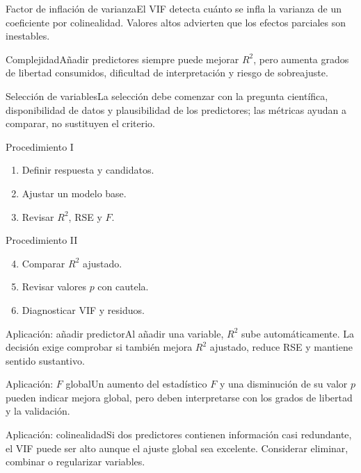 \documentclass[10pt,aspectratio=169]{beamer}
\begin{document}
\begin{frame}{Factor de inflación de varianza}\small El VIF detecta cuánto se infla la varianza de un coeficiente por colinealidad. Valores altos advierten que los efectos parciales son inestables.\end{frame}
\begin{frame}{Complejidad}\small Añadir predictores siempre puede mejorar $R^2$, pero aumenta grados de libertad consumidos, dificultad de interpretación y riesgo de sobreajuste.\end{frame}
\begin{frame}{Selección de variables}\small La selección debe comenzar con la pregunta científica, disponibilidad de datos y plausibilidad de los predictores; las métricas ayudan a comparar, no sustituyen el criterio.\end{frame}
\begin{frame}{Procedimiento I}\small\begin{enumerate}\item Definir respuesta y candidatos.\item Ajustar un modelo base.\item Revisar $R^2$, RSE y $F$.\end{enumerate}\end{frame}
\begin{frame}{Procedimiento II}\small\begin{enumerate}\setcounter{enumi}{3}\item Comparar $R^2$ ajustado.\item Revisar valores $p$ con cautela.\item Diagnosticar VIF y residuos.\end{enumerate}\end{frame}
\begin{frame}{Aplicación: añadir predictor}\small Al añadir una variable, $R^2$ sube automáticamente. La decisión exige comprobar si también mejora $R^2$ ajustado, reduce RSE y mantiene sentido sustantivo.\end{frame}
\begin{frame}{Aplicación: $F$ global}\small Un aumento del estadístico $F$ y una disminución de su valor $p$ pueden indicar mejora global, pero deben interpretarse con los grados de libertad y la validación.\end{frame}
\begin{frame}{Aplicación: colinealidad}\small Si dos predictores contienen información casi redundante, el VIF puede ser alto aunque el ajuste global sea excelente. Considerar eliminar, combinar o regularizar variables.\end{frame}
\end{document}
